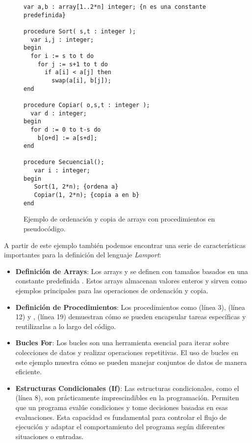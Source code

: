 \newpage

\begin{figure}[h]
\begin{lstlisting}[style=lamportStyle]
var a,b : array[1..2*n] integer; {n es una constante predefinida}

procedure Sort( s,t : integer );
  var i,j : integer;
begin
  for i := s to t do
    for j := s+1 to t do
      if a[i] < a[j] then
        swap(a[i], b[j]);
end

procedure Copiar( o,s,t : integer );
  var d : integer;
begin
  for d := 0 to t-s do
    b[o+d] := a[s+d];
end

procedure Secuencial();
   var i : integer;
begin
   Sort(1, 2*n); {ordena a}
   Copiar(1, 2*n); {copia a en b}
end
\end{lstlisting}
\caption{Ejemplo de ordenación y copia de arrays con procedimientos en pseudocódigo.}
\label{fig:ejemplo2}
\end{figure}

A partir de este ejemplo también podemos encontrar una serie de características importantes para la definición del lenguaje \textit{Lamport}:

\begin{itemize}
    \item \textbf{Definición de Arrays}: Los arrays  y  se definen con tamaños basados en una constante predefinida . Estos arrays almacenan valores enteros y sirven como ejemplos principales para las operaciones de ordenación y copia.

    \item \textbf{Definición de Procedimientos}: Los procedimientos como  (línea 3),  (línea 12) y , (línea 19) demuestran cómo se pueden encapsular tareas específicas y reutilizarlas a lo largo del código.

    \item \textbf{Bucles For}: Los bucles son una herramienta esencial para iterar sobre colecciones de datos y realizar operaciones repetitivas. El uso de bucles  en este ejemplo muestra cómo se pueden manejar conjuntos de datos de manera eficiente.

    \item \textbf{Estructuras Condicionales (If)}: Las estructuras condicionales, como el  (línea 8), son prácticamente imprescindibles en la programación. Permiten que un programa evalúe condiciones y tome decisiones basadas en esas evaluaciones. Esta capacidad es fundamental para controlar el flujo de ejecución y adaptar el comportamiento del programa según diferentes situaciones o entradas.
\end{itemize}

